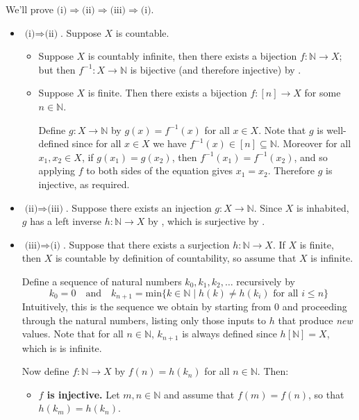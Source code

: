 \begin{cproof}
We'll prove $\text{(i)} \Rightarrow \text{(ii)} \Rightarrow \text{(iii)} \Rightarrow \text{(i)}$.

\begin{itemize}
\item $\text{(i)} \Rightarrow \text{(ii)}$. Suppose $X$ is countable.
\begin{itemize}
\item Suppose $X$ is countably infinite, then there exists a bijection $f : \mathbb{N} \to X$; but then $f^{-1} : X \to \mathbb{N}$ is bijective (and therefore injective) by .
\item Suppose $X$ is finite. Then there exists a bijection $f : [n] \to X$ for some $n \in \mathbb{N}$.

Define $g : X \to \mathbb{N}$ by $g(x) = f^{-1}(x)$ for all $x \in X$. Note that $g$ is well-defined since for all $x \in X$ we have $f^{-1}(x) \in [n] \subseteq \mathbb{N}$. Moreover for all $x_1,x_2 \in X$, if $g(x_1)=g(x_2)$, then $f^{-1}(x_1) = f^{-1}(x_2)$, and so applying $f$ to both sides of the equation gives $x_1=x_2$. Therefore $g$ is injective, as required.
\end{itemize}

\item $\text{(ii)} \Rightarrow \text{(iii)}$. Suppose there exists an injection $g : X \to \mathbb{N}$. Since $X$ is inhabited, $g$ has a left inverse $h : \mathbb{N} \to X$ by , which is surjective by .

\item $\text{(iii)} \Rightarrow \text{(i)}$. Suppose that there exists a surjection $h : \mathbb{N} \to X$. If $X$ is finite, then $X$ is countable by definition of countability, so assume that $X$ is infinite.

Define a sequence of natural numbers $k_0,k_1,k_2,\dots$ recursively by
\[ k_0 = 0 \quad \text{and} \quad k_{n+1} = \mathrm{min} \{ k \in \mathbb{N} \mid h(k) \ne h(k_i) \text{ for all } i \le n \} \] 
Intuitively, this is the sequence we obtain by starting from $0$ and proceeding through the natural numbers, listing only those inputs to $h$ that produce \textit{new} values. Note that for all $n \in \mathbb{N}$, $k_{n+1}$ is always defined since $h[\mathbb{N}] = X$, which is is infinite.

Now define $f : \mathbb{N} \to X$ by $f(n) = h(k_n)$ for all $n \in \mathbb{N}$. Then:
\begin{itemize}
\item \textbf{$f$ is injective.} Let $m,n \in \mathbb{N}$ and assume that $f(m)=f(n)$, so that $h(k_m) = h(k_n)$.


\end{itemize}
\end{itemize}
\end{cproof}
